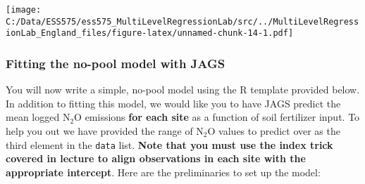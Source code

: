 \documentclass[
]{article}
\begin{document}
\texttt{[image: C:/Data/ESS575/ess575\_MultiLevelRegressionLab/src/../MultiLevelRegressionLab\_England\_files/figure-latex/unnamed-chunk-14-1.pdf]}

\hypertarget{fitting-the-no-pool-model-with-jags}{%
\subsubsection{Fitting the no-pool model with
JAGS}\label{fitting-the-no-pool-model-with-jags}}

You will now write a simple, no-pool model using the R template provided
below. In addition to fitting this model, we would like you to have JAGS
predict the mean logged \(\textrm{N} _2 \textrm{O}\) emissions
\textbf{for each site} as a function of soil fertilizer input. To help
you out we have provided the range of \(\textrm{N} _2 \textrm{O}\)
values to predict over as the third element in the \texttt{data} list.
\textbf{Note that you must use the index trick covered in lecture to
align observations in each site with the appropriate intercept}. Here
are the preliminaries to set up the model:
\end{document}
